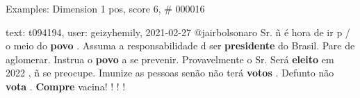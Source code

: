 \begin{frame}{Examples: Dimension 1 pos, score 6, \# 000016}
\footnotesize
\begin{exampleblock}{text: t094194, user: geizyhemily, 2021-02-27}
@jairbolsonaro Sr. ñ é hora de ir p / o meio do \textbf{povo} . Assuma a 
responsabilidade d ser \textbf{presidente} do Brasil. Pare de aglomerar. 
Instrua o \textbf{povo} a se prevenir. Provavelmente o Sr. Será \textbf{eleito} 
em 2022 , ñ se preocupe. Imunize as pessoas senão não terá \textbf{votos} . 
Defunto não \textbf{vota} . \textbf{Compre} vacina! ! ! ! 
\end{exampleblock}
\end{frame}
